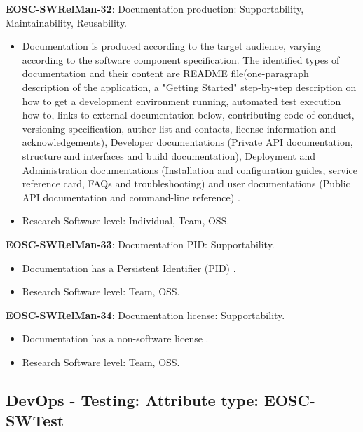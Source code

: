 \textbf{EOSC-SWRelMan-32}: Documentation production: Supportability, Maintainability, Reusability.

\begin{itemize}
    \item Documentation is produced according to the target audience, varying according to the software component specification. The identified types of documentation and their content are README file(one-paragraph description of the application, a "Getting Started" step-by-step description on how to get a development environment running, automated test execution how-to, links to external documentation below, contributing code of conduct, versioning specification, author list and contacts, license information and acknowledgements), Developer documentations (Private API documentation, structure and interfaces and build documentation), Deployment and Administration documentations (Installation and configuration guides, service reference card, FAQs and troubleshooting) and user documentations (Public API documentation and command-line reference) \cite{aberdour_achieving_2007,shepherdson_cessda_2019,orviz_set_2017,orviz_fernandez_eosc-synergy_2020,raymond_software_2013}.
    \item Research Software level: Individual, Team, OSS.
\end{itemize}

\textbf{EOSC-SWRelMan-33}: Documentation PID: Supportability.

\begin{itemize}
    \item Documentation has a Persistent Identifier (PID) \cite{orviz_fernandez_eosc-synergy_2020}.
    \item Research Software level: Team, OSS.
\end{itemize}

\textbf{EOSC-SWRelMan-34}: Documentation license: Supportability.

\begin{itemize}
    \item Documentation has a non-software license \cite{orviz_fernandez_eosc-synergy_2020}.
    \item Research Software level: Team, OSS.
\end{itemize}

\subsection{DevOps - Testing: Attribute type: EOSC-SWTest}

